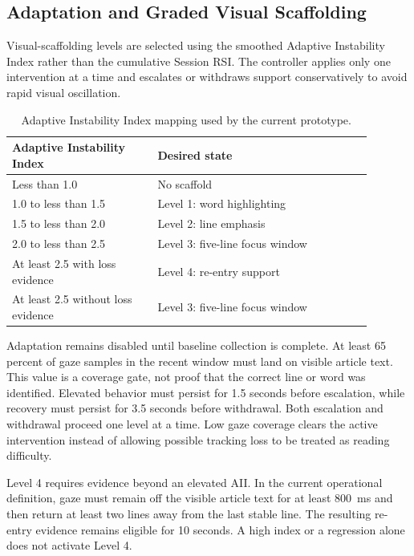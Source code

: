 \subsection{Adaptation and Graded Visual Scaffolding}

Visual-scaffolding levels are selected using the smoothed Adaptive Instability
Index rather than the cumulative Session RSI. The controller applies only one
intervention at a time and escalates or withdraws support conservatively to
avoid rapid visual oscillation.

\begin{table}[ht]
\centering
\caption{Adaptive Instability Index mapping used by the current prototype.}
\begin{tabular}{p{0.36\linewidth}p{0.53\linewidth}}
\hline
\textbf{Adaptive Instability Index} & \textbf{Desired state}\\
\hline
Less than 1.0 & No scaffold\\
1.0 to less than 1.5 & Level 1: word highlighting\\
1.5 to less than 2.0 & Level 2: line emphasis\\
2.0 to less than 2.5 & Level 3: five-line focus window\\
At least 2.5 with loss evidence & Level 4: re-entry support\\
At least 2.5 without loss evidence & Level 3: five-line focus window\\
\hline
\end{tabular}
\end{table}

Adaptation remains disabled until baseline collection is complete. At least 65
percent of gaze samples in the recent window must land on visible article text.
This value is a coverage gate, not proof that the correct line or word was
identified. Elevated behavior must persist for 1.5 seconds before escalation,
while recovery must persist for 3.5 seconds before withdrawal. Both escalation
and withdrawal proceed one level at a time. Low gaze coverage clears the active
intervention instead of allowing possible tracking loss to be treated as reading
difficulty.

Level 4 requires evidence beyond an elevated AII. In the current operational
definition, gaze must remain off the visible article text for at least 800~ms
and then return at least two lines away from the last stable line. The resulting
re-entry evidence remains eligible for 10 seconds. A high index or a regression
alone does not activate Level 4.

